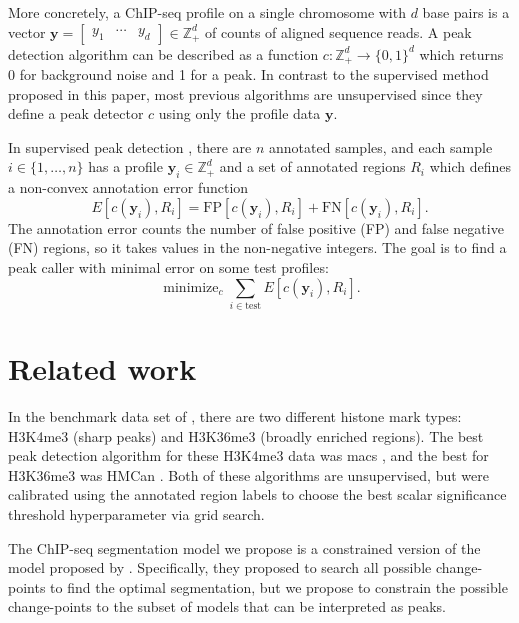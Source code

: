 \documentclass{article}
\DeclareMathOperator*{\minimize}{minimize}
\newcommand{\ZZ}{\mathbb Z}
\begin{document}
More concretely, a ChIP-seq profile on a single
chromosome with $d$ base pairs is a vector $\mathbf y=
\left[
  \begin{array}{ccc}
    y_1 & \cdots & y_d
  \end{array}
\right]\in\ZZ_+^d$ of counts of aligned sequence reads. A peak
detection algorithm can be described as a function $c:\ZZ_+^d
\rightarrow \{0, 1\}^d$ which returns 0 for background noise and 1 for
a peak. In contrast to the supervised method proposed in this paper,
most previous algorithms are unsupervised since they define a peak
detector $c$ using only the profile data $\mathbf y$.

In supervised peak detection \citep{hocking2014visual}, there
are $n$ annotated samples, and each sample $i\in\{1, \dots, n\}$ has a
profile $\mathbf y_i\in\ZZ_+^d$ and a set of annotated regions $R_i$
which defines a non-convex annotation error function
\begin{equation}
  \label{eq:error}
  E[c(\mathbf y_i),  R_i] =
  \text{FP}[c(\mathbf y_i), R_i] +
  \text{FN}[c(\mathbf y_i), R_i].
\end{equation}
The annotation error counts the number of false positive (FP) and
false negative (FN) regions, so it takes values in the non-negative
integers. The goal is to find a peak caller with minimal error on some
test profiles:
\begin{equation}
  \label{eq:min_error}
  \minimize_c \sum_{i\in\text{test}} E[c(\mathbf y_i),  R_i].
\end{equation}

\section{Related work}

In the benchmark data set of \citet{hocking2014visual}, there are two
different histone mark types: H3K4me3 (sharp peaks) and H3K36me3
(broadly enriched regions). The best peak detection algorithm for
these H3K4me3 data was macs \citep{MACS}, and the best for H3K36me3
was HMCan \citep{HMCan}. Both of these algorithms are unsupervised,
but were calibrated using the annotated region labels to choose the
best scalar significance threshold hyperparameter via grid search.

The ChIP-seq segmentation model we propose is a constrained version of
the model proposed by \citet{cleynen2013segmentation}. Specifically,
they proposed to search all possible change-points to find the optimal
segmentation, but we propose to constrain the possible change-points to
the subset of models that can be interpreted as peaks.
\end{document}
